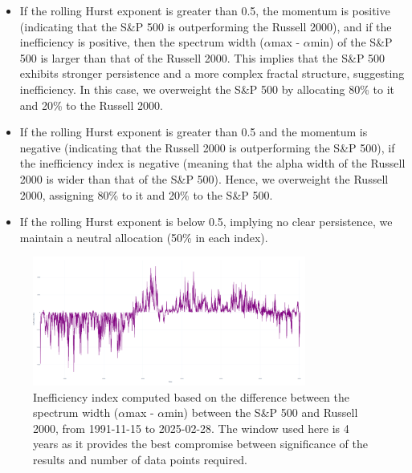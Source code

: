 \documentclass[11pt]{extarticle}
\begin{document}
\begin{itemize}
    \item If the rolling Hurst exponent is greater than 0.5, the momentum is positive (indicating that the S\&P 500 is
    outperforming the Russell 2000), and if the inefficiency is positive,
    then the spectrum width ($\alpha$max - $\alpha$min) of the S\&P 500 is larger than that of the Russell 2000. This implies that the S\&P 500 exhibits stronger
    persistence and a more complex fractal structure, suggesting inefficiency. In this case, we overweight the S\&P 500 by allocating
    80\% to it and 20\% to the Russell 2000.

    \item If the rolling Hurst exponent is greater than 0.5 and the momentum is negative (indicating that the Russell 2000 is
    outperforming the S\&P 500), if the inefficiency index is negative (meaning that the alpha width of the
    Russell 2000 is wider than that of the S\&P 500). Hence, we overweight the Russell 2000, assigning 80\% to it and 20\% to the S\&P 500.

    \item If the rolling Hurst exponent is below 0.5, implying no clear persistence, we maintain a neutral allocation (50\% in each index).
\end{itemize}


\begin{figure}[ht]
    \centering
    \includegraphics[width=0.8\textwidth]{img/inefficiency_index.png}
    \caption{Inefficiency index computed based on the difference between the spectrum width ($\alpha$max - $\alpha$min) between the
    S\&P 500 and Russell 2000, from 1991-11-15 to 2025-02-28. The window used here is 4 years as it provides the best compromise between significance of the results
    and number of data points required.}
    \label{fig:inefficiency_index}
\end{figure}
\FloatBarrier
\end{document}
